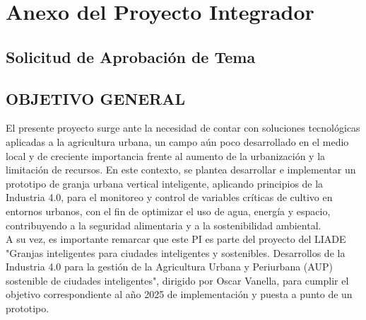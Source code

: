\chapter{Anexo del Proyecto Integrador}
\label{anexoPI}

\section*{Solicitud de Aprobación de Tema}
\vspace{0.5cm}

\section*{OBJETIVO GENERAL}
El presente proyecto surge ante la necesidad de contar con soluciones tecnológicas aplicadas a la agricultura urbana, un campo aún poco desarrollado en el medio local y de creciente importancia frente al aumento de la urbanización y la limitación de recursos. En este contexto, se plantea desarrollar e implementar un prototipo de granja urbana vertical inteligente, aplicando principios de la Industria 4.0, para el monitoreo y control de variables críticas de cultivo en entornos urbanos, con el fin de optimizar el uso de agua, energía y espacio, contribuyendo a la seguridad alimentaria y a la sostenibilidad ambiental.\\
A su vez, es importante remarcar que este PI es parte del proyecto del LIADE "Granjas inteligentes para ciudades inteligentes y sostenibles. Desarrollos de la Industria 4.0 para la gestión de la Agricultura Urbana y Periurbana (AUP) sostenible de ciudades inteligentes", dirigido por Oscar Vanella, para cumplir el objetivo correspondiente al año 2025 de implementación y puesta a punto de un prototipo.

